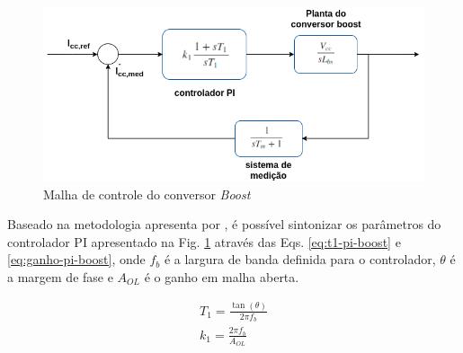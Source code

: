 \begin{figure}[!hbt]
	\begin{center}
		\includegraphics[scale=0.60]{figuras/pi_boost.png}
		\caption{Malha de controle do conversor \textit{Boost}}
		\label{fig:pi-boost}
	\end{center}
\end{figure}

Baseado na metodologia apresenta por \cite{Saleh2012}, é possível sintonizar os parâmetros do controlador PI
apresentado na Fig. \ref{fig:pi-boost} através das Eqs. \ref{eq:t1-pi-boost} e \ref{eq:ganho-pi-boost}, 
onde $f_b$ é a largura de banda definida para o controlador, $\theta$ é a margem de fase e $A_{OL}$ é o ganho 
em malha aberta.

\begin{align}
	T_1 = \frac{\tan(\theta)}{2\pi f_b}\label{eq:t1-pi-boost}\\
	k_1 = \frac{2\pi f_b}{A_{OL}}\label{eq:ganho-pi-boost}
\end{align}